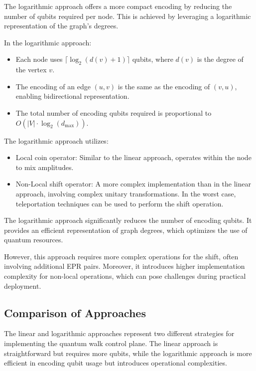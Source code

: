 \documentclass{article}
\begin{document}
		The logarithmic approach offers a more compact encoding by reducing the number of qubits required per node. This is achieved by leveraging a logarithmic representation of the graph's degrees.
		
		In the logarithmic approach:
		\begin{itemize}
			\item Each node uses \( \lceil \log_2(d(v) + 1) \rceil \) qubits, where \( d(v) \) is the degree of the vertex \( v \).
			\item The encoding of an edge \( (u, v) \) is the same as the encoding of \( (v, u) \), enabling bidirectional representation.
			\item The total number of encoding qubits required is proportional to \( O(|V| \cdot \log_2(d_{\text{max}})) \).
		\end{itemize}
		
		The logarithmic approach utilizes:
		\begin{itemize}
			\item Local coin operator: Similar to the linear approach, operates within the node to mix amplitudes.
			\item Non-Local shift operator: A more complex implementation than in the linear approach, involving complex unitary transformations. In the worst case, teleportation techniques can be used to perform the shift operation.
		\end{itemize}
		
		The logarithmic approach significantly reduces the number of encoding qubits. It provides an efficient representation of graph degrees, which optimizes the use of quantum resources.

		However, this approach requires more complex operations for the shift, often involving additional EPR pairs. Moreover, it introduces higher implementation complexity for non-local operations, which can pose challenges during practical deployment.
		
	\subsection{Comparison of Approaches}
		The linear and logarithmic approaches represent two different strategies for implementing the quantum walk control plane. The linear approach is straightforward but requires more qubits, while the logarithmic approach is more efficient in encoding qubit usage but introduces operational complexities.
		
\end{document}

